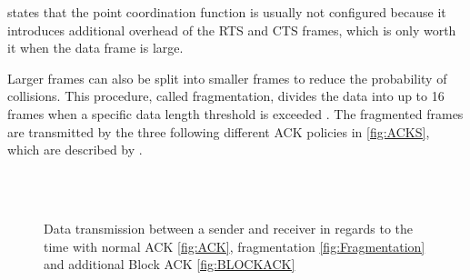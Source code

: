\textcite{sauter_wireless_2022} states that the point coordination function is usually not configured because it introduces additional
overhead of the \ac{RTS} and \ac{CTS} frames, which is only worth it when the data frame is large.

Larger frames can also be split into smaller frames to reduce the probability of collisions.
This procedure, called fragmentation, divides the data into up to \num{16} frames
when a specific data length threshold is exceeded \cite{noauthor_ieee_2021}.
The fragmented frames are transmitted by the three following different \ac{ACK} policies in \autoref{fig:ACKS}, which are described by \textcite{sauter_wireless_2022}.

\begin{figure}%
    \centering
    \\
    \\
    \caption{Data transmission between a sender and receiver in regards to the time with normal \acf{ACK} \autoref{fig:ACK},
    fragmentation \autoref{fig:Fragmentation} and additional Block \ac{ACK} \autoref{fig:BLOCKACK}}%
    \label{fig:ACKS}%
\end{figure}

